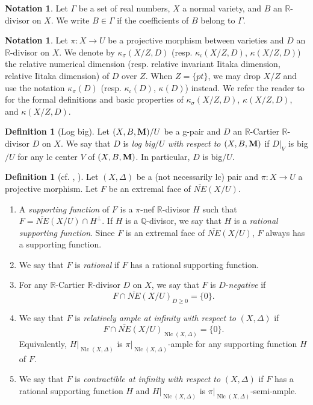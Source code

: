 \documentclass[11pt]{amsart}
\numberwithin{equation}{section}
\newcommand{\Mm}{{\bf{M}}}
\newcommand{\Qq}{\mathbb{Q}}
\newcommand{\Rr}{\mathbb{R}}
\newcommand{\Nlc}{\operatorname{Nlc}}
\newcommand{\Ii}{\Gamma}
\theoremstyle{definition}
\newtheorem{defn}[thm]{Definition}
\theoremstyle{definition}
\newtheorem{nota}[thm]{Notation}
\theoremstyle{definition}
\begin{document}
\begin{nota}
    Let $\Ii$ be a set of real numbers, $X$ a normal variety, and $B$ an $\Rr$-divisor on $X$. We write $B\in\Ii$ if the coefficients of $B$ belong to $\Ii$.
\end{nota}

\begin{nota}
    Let $\pi: X\rightarrow U$ be a projective morphism between varieties and $D$ an $\Rr$-divisor on $X$. We denote by $\kappa_{\sigma}(X/Z,D)$ (resp. $\kappa_{\iota}(X/Z,D)$, $\kappa(X/Z,D)$) the relative numerical dimension (resp. relative invariant Iitaka dimension, relative Iitaka dimension) of $D$ over $Z$. When $Z=\{pt\}$, we may drop $X/Z$ and use the notation $\kappa_{\sigma}(D)$ (resp. $\kappa_{\iota}(D)$, $\kappa(D)$) instead. We refer the reader to \cite[Section 2]{HH20} for the formal definitions and basic properties of $\kappa_{\sigma}(X/Z,D)$, $\kappa(X/Z,D)$, and $\kappa(X/Z,D)$.
\end{nota}

\begin{defn}[Log big]\label{defn: log big}
Let $(X,B,\Mm)/U$ be a g-pair and $D$ an $\Rr$-Cartier $\Rr$-divisor $D$ on $X$. We say that $D$ is \emph{log big$/U$ with respect to $(X,B,\Mm)$} if $D|_V$ is big$/U$ for any lc center $V$ of $(X,B,\Mm)$. In particular, $D$ is big$/U$.
\end{defn}

\begin{defn}[{cf. \cite[Definition 5.3]{Amb03}, \cite[Definition 6.7.2]{Fuj11}}]\label{defn: basics of cone theorem}
Let $(X,\Delta)$ be a (not necessarily lc) pair and $\pi: X\rightarrow U$ a projective morphism. Let $F$ be an extremal face of $\overline{NE}(X/U)$.
\begin{enumerate}
    \item A \emph{supporting function} of $F$ is a  $\pi$-nef $\Rr$-divisor $H$ such that $F=\overline{NE}(X/U)\cap H^{\bot}$. If $H$ is a $\Qq$-divisor, we say that $H$ is a \emph{rational supporting function}. Since $F$ is an extremal face of $\overline{NE}(X/U)$, $F$ always has a supporting function.
    \item We say that $F$ is \emph{rational} if $F$ has a rational supporting function.
    \item For any $\Rr$-Cartier $\Rr$-divisor $D$ on $X$, we say that $F$ is $D$-\emph{negative} if $$F\cap\overline{NE}(X/U)_{D\geq 0}=\{0\}.$$
    \item We say that $F$ is \emph{relatively ample at infinity with respect to} $(X,\Delta)$  if $$F\cap\overline{NE}(X/U)_{\Nlc(X,\Delta)}=\{0\}.$$ Equivalently, $H|_{\Nlc(X,\Delta)}$ is $\pi|_{\Nlc(X,\Delta)}$-ample for any supporting function $H$ of $F$.
    \item We say that $F$ is \emph{contractible at infinity with respect to} $(X,\Delta)$ if $F$ has a rational supporting function $H$ and $H|_{\Nlc(X,\Delta)}$ is $\pi|_{\Nlc(X,\Delta)}$-semi-ample.
\end{enumerate}
\end{defn}
\end{document}
